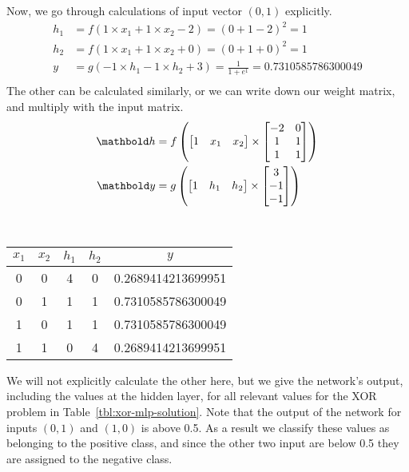 Now, we go through calculations of input vector $(0,1)$ explicitly.
\begin{align*}
  h_{1} &=  f(1 \times x_{1} + 1 \times x_{2} - 2) = (0 + 1 - 2)^{2} = 1\\
  h_{2} &=  f(1 \times x_{1} + 1 \times x_{2} + 0) = (0 + 1 + 0)^{2} = 1\\
  y &= g(-1 \times h_{1} -1 \times h_{2} + 3) = \frac{1}{1+ e^{1}} = \num{0.7310585786300049}\\
\end{align*}
The other can be calculated similarly,
or we can write down our weight matrix, and multiply with the input matrix.
\begin{align*}
  \vect{h} &= f\left(\begin{bmatrix}1 & x_{1} & x_{2}\\\end{bmatrix} \times
    \begin{bmatrix}-2 & 0 \\ 1 & 1 \\ 1 & 1 \\\end{bmatrix} \right) \\
  \vect{y} &= g\left(\begin{bmatrix}1 & h_{1} & h_{2}\\\end{bmatrix} \times
    \begin{bmatrix}3 \\ -1 \\ -1 \\\end{bmatrix} \right) \\
\end{align*}
\begin{margintable}[-8\baselineskip]
  \centering
  \caption{\label{tbl:xor-mlp-solution}%
    The solution for the XOR problem using the network
    in Figure~\ref{fig:mlp-xor}.
  }
  ~\\[1mm]
  \begin{tabular}{SSSSS}
    \toprule
    {$x_{1}$} & {$x_{2}$} & {$h_{1}$} & {$h_{2}$} & {$y$}\\
     & 0 & 4 & 0 & 0.2689414213699951 \\
    0 & 1 & 1 & 1 & 0.7310585786300049 \\
    1 & 0 & 1 & 1 & 0.7310585786300049 \\
    1 & 1 & 0 & 4 & 0.2689414213699951 \\
    \bottomrule
  \end{tabular}
\end{margintable}
We will not explicitly calculate the other here,
but we give the network's output,
including the values at the hidden layer,
for all relevant values for the XOR problem
in Table~\ref{tbl:xor-mlp-solution}.
Note that the output of the network for inputs $(0,1)$ and $(1,0)$
is above \num{0.5}.
As a result we classify these values as belonging to the positive class,
and since the other two input are below \num{0.5} they are
assigned to the negative class.

